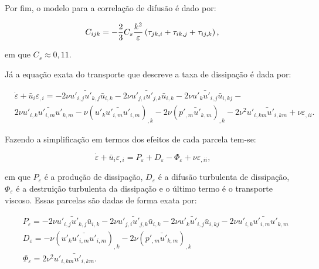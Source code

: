 \documentclass[_ArquivoPrincipal.tex]{subfiles}
\begin{document}
Por fim, o modelo para a correlação de difusão é dado por:

\begin{equation}
    C_{ijk}=-\frac{2}{3}C_s\frac{k^2}{\varepsilon}\left({\tau_{jk,i}+\tau_{ik,j}+\tau_{ij,k}}\right)\text{,}
\end{equation}

\noindent em que $C_s\approx0,11$.

Já a equação exata do transporte que descreve a taxa de dissipação é dada por:

\begin{equation}
    \begin{split}
        &\dot{\varepsilon}+\bar{u}_i\varepsilon_{,i}=-2\nu\bar{u'_{i,j}u'_{k,j}}\bar{u}_{i,k}-2\nu\bar{u'_{j,i}u'_{j,k}}\bar{u}_{i,k}-2\nu\bar{u'_ku'_{i,j}}\bar{u}_{i,kj}-\\
        &2\nu\bar{u'_{i,k}u'_{i,m}u'_{k,m}}-\nu(\bar{u'_ku'_{i,m}u'_{i,m}})_{,k}-2\nu(\bar{p'_{,m}u'_{k,m}})_{,k}-2\nu^2\bar{u'_{i,km}u'_{i,km}}+\nu\varepsilon_{,ii}\text{.}
    \end{split}
\end{equation}

Fazendo a simplificação em termos dos efeitos de cada parcela tem-se:

\begin{equation}
    \dot{\varepsilon}+\bar{u}_i\varepsilon_{,i}=P_\varepsilon+D_\varepsilon-\Phi_\varepsilon+\nu\varepsilon_{,ii}\text{,}
\end{equation}

\noindent em que $P_\varepsilon$ é a produção de dissipação, $D_\varepsilon$ é a difusão turbulenta de dissipação, $\Phi_\varepsilon$ é a destruição turbulenta da dissipação e o último termo é o transporte viscoso. Essas parcelas são dadas de forma exata por:

\begin{subequations}
    \begin{align}
         & P_\varepsilon=-2\nu\bar{u'_{i,j}u'_{k,j}}\bar{u}_{i,k}-2\nu\bar{u'_{j,i}u'_{j,k}}\bar{u}_{i,k}-2\nu\bar{u'_ku'_{i,j}}\bar{u}_{i,kj}-2\nu\bar{u'_{i,k}u'_{i,m}u'_{k,m}} \\
         & D_\varepsilon=-\nu(\bar{u'_ku'_{i,m}u'_{i,m}})_{,k}-2\nu(\bar{p'_{,m}u'_{k,m}})_{,k}                                                                                   \\
         & \Phi_\varepsilon=2\nu^2\bar{u'_{i,km}u'_{i,km}}\text{.}
    \end{align}
\end{subequations}
\end{document}
